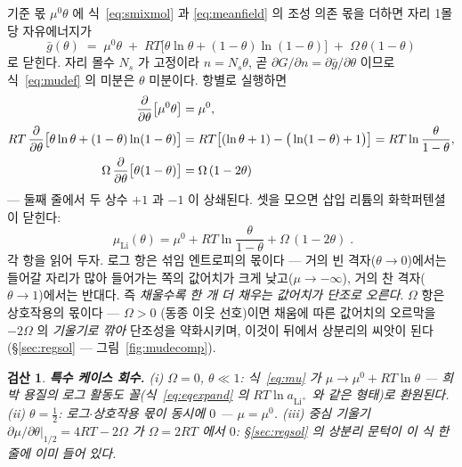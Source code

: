 \documentclass[11pt,a4paper]{article}
\newtheorem*{verifybox}{검산}
\begin{document}
기준 몫 $\mu^0\theta$ 에 식~\eqref{eq:smixmol} 과 \eqref{eq:meanfield} 의 조성 의존 몫을 더하면
자리 1몰당 자유에너지가
\begin{equation}
\bar g(\theta)\;=\;\mu^0\theta\;+\;RT\big[\theta\ln\theta+(1-\theta)\ln(1-\theta)\big]
\;+\;\Omega\,\theta(1-\theta)
\label{eq:gbar}
\end{equation}
로 닫힌다. 자리 몰수 $N_s$ 가 고정이라 $n=N_s\theta$, 곧
$\partial G/\partial n=\partial\bar g/\partial\theta$ 이므로 식~\eqref{eq:mudef} 의 미분은
$\theta$ 미분이다. 항별로 실행하면
\begin{align}
\frac{\partial}{\partial\theta}\big[\mu^0\theta\big]&=\mu^0,\notag\\
RT\,\frac{\partial}{\partial\theta}\big[\theta\ln\theta+(1-\theta)\ln(1-\theta)\big]
&=RT\big[(\ln\theta+1)-\big(\ln(1-\theta)+1\big)\big]=RT\ln\frac{\theta}{1-\theta},
\label{eq:mixderiv}\\
\Omega\,\frac{\partial}{\partial\theta}\big[\theta(1-\theta)\big]&=\Omega\,(1-2\theta)
\notag
\end{align}
— 둘째 줄에서 두 상수 $+1$ 과 $-1$ 이 상쇄된다. 셋을 모으면 삽입 리튬의 화학퍼텐셜이 닫힌다:
\begin{equation}
\boxed{\;\mu_{\mathrm{Li}}(\theta)=\mu^0+RT\ln\frac{\theta}{1-\theta}+\Omega\,(1-2\theta)\;.}
\label{eq:mu}
\end{equation}
각 항을 읽어 두자. 로그 항은 섞임 엔트로피의 몫이다 — 거의 빈 격자($\theta\to0$)에서는 들어갈 자리가
많아 들어가는 쪽의 값어치가 크게 낮고($\mu\to-\infty$), 거의 찬 격자($\theta\to1$)에서는 반대다. 즉
\emph{채울수록 한 개 더 채우는 값어치가 단조로 오른다}. $\Omega$ 항은 상호작용의 몫이다 — $\Omega>0$
(동종 이웃 선호)이면 채움에 따른 값어치의 오르막을 $-2\Omega$ 의 \emph{기울기로 깎아} 단조성을
약화시키며, 이것이 뒤에서 상분리의 씨앗이 된다(\S\ref{sec:regsol} — 그림~\ref{fig:mudecomp}).

\begin{verifybox}
\textbf{특수 케이스 회수.} (i) $\Omega=0$, $\theta\ll1$: 식~\eqref{eq:mu} 가
$\mu\to\mu^0+RT\ln\theta$ — 희박 용질의 로그 활동도 꼴(식~\eqref{eq:eqexpand} 의
$RT\ln a_{\mathrm{Li^+}}$ 와 같은 형태)로 환원된다. (ii) $\theta=\tfrac12$: 로그$\cdot$상호작용
몫이 동시에 $0$ — $\mu=\mu^0$. (iii) 중심 기울기
$\partial\mu/\partial\theta|_{1/2}=4RT-2\Omega$ 가 $\Omega=2RT$ 에서 $0$:
\S\ref{sec:regsol} 의 상분리 문턱이 이 식 한 줄에 이미 들어 있다.
\end{verifybox}
\end{document}
